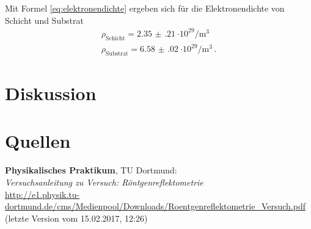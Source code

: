 \documentclass[captions=tableheading]{scrartcl}
\begin{document}
Mit Formel \ref{eq:elektronendichte} ergeben sich für die Elektronendichte von Schicht und Substrat
\begin{align*}
\rho_{\text{Schicht}}=\SI{2.35(21)}{\cdot10^{29}\per\metre\cubed} \\
\rho_{\text{Substrat}}=\SI{6.58(02)}{\cdot10^{29}\per\metre\cubed}\,.
\end{align*}

\section{Diskussion}

\section{Quellen}
\begin{enumerate}[label={[\arabic*]}]
\item \label{q:anleitung} \textbf{Physikalisches Praktikum}, TU Dortmund: \\
\textit{Versuchsanleitung zu Versuch: Röntgenreflektometrie} \\
\url{http://e1.physik.tu-dortmund.de/cms/Medienpool/Downloads/Roentgenreflektometrie_Versuch.pdf} (letzte Version vom 15.02.2017, 12:26)
\end{enumerate}
\end{document}
